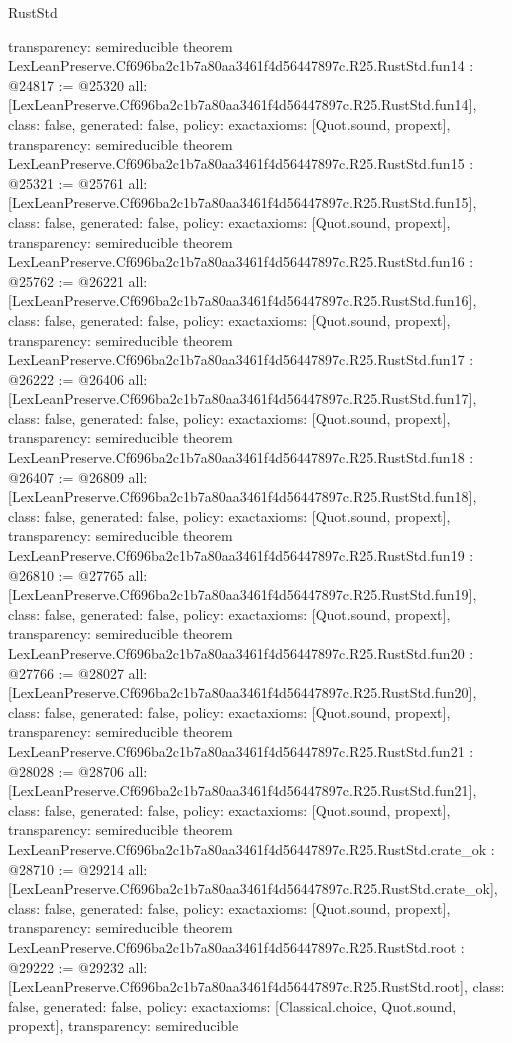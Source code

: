 \begin{lexlean}{RustStd}
\begin{coremodule}
{  transparency: semireducible
}
theorem LexLeanPreserve.Cf696ba2c1b7a80aa3461f4d56447897c.R25.RustStd.fun14 : @24817 := @25320 {
  all: [LexLeanPreserve.Cf696ba2c1b7a80aa3461f4d56447897c.R25.RustStd.fun14],
  class: false,
  generated: false,
  policy: exact{axioms: [Quot.sound, propext]},
  transparency: semireducible
}
theorem LexLeanPreserve.Cf696ba2c1b7a80aa3461f4d56447897c.R25.RustStd.fun15 : @25321 := @25761 {
  all: [LexLeanPreserve.Cf696ba2c1b7a80aa3461f4d56447897c.R25.RustStd.fun15],
  class: false,
  generated: false,
  policy: exact{axioms: [Quot.sound, propext]},
  transparency: semireducible
}
theorem LexLeanPreserve.Cf696ba2c1b7a80aa3461f4d56447897c.R25.RustStd.fun16 : @25762 := @26221 {
  all: [LexLeanPreserve.Cf696ba2c1b7a80aa3461f4d56447897c.R25.RustStd.fun16],
  class: false,
  generated: false,
  policy: exact{axioms: [Quot.sound, propext]},
  transparency: semireducible
}
theorem LexLeanPreserve.Cf696ba2c1b7a80aa3461f4d56447897c.R25.RustStd.fun17 : @26222 := @26406 {
  all: [LexLeanPreserve.Cf696ba2c1b7a80aa3461f4d56447897c.R25.RustStd.fun17],
  class: false,
  generated: false,
  policy: exact{axioms: [Quot.sound, propext]},
  transparency: semireducible
}
theorem LexLeanPreserve.Cf696ba2c1b7a80aa3461f4d56447897c.R25.RustStd.fun18 : @26407 := @26809 {
  all: [LexLeanPreserve.Cf696ba2c1b7a80aa3461f4d56447897c.R25.RustStd.fun18],
  class: false,
  generated: false,
  policy: exact{axioms: [Quot.sound, propext]},
  transparency: semireducible
}
theorem LexLeanPreserve.Cf696ba2c1b7a80aa3461f4d56447897c.R25.RustStd.fun19 : @26810 := @27765 {
  all: [LexLeanPreserve.Cf696ba2c1b7a80aa3461f4d56447897c.R25.RustStd.fun19],
  class: false,
  generated: false,
  policy: exact{axioms: [Quot.sound, propext]},
  transparency: semireducible
}
theorem LexLeanPreserve.Cf696ba2c1b7a80aa3461f4d56447897c.R25.RustStd.fun20 : @27766 := @28027 {
  all: [LexLeanPreserve.Cf696ba2c1b7a80aa3461f4d56447897c.R25.RustStd.fun20],
  class: false,
  generated: false,
  policy: exact{axioms: [Quot.sound, propext]},
  transparency: semireducible
}
theorem LexLeanPreserve.Cf696ba2c1b7a80aa3461f4d56447897c.R25.RustStd.fun21 : @28028 := @28706 {
  all: [LexLeanPreserve.Cf696ba2c1b7a80aa3461f4d56447897c.R25.RustStd.fun21],
  class: false,
  generated: false,
  policy: exact{axioms: [Quot.sound, propext]},
  transparency: semireducible
}
theorem LexLeanPreserve.Cf696ba2c1b7a80aa3461f4d56447897c.R25.RustStd.crate_ok : @28710 := @29214 {
  all: [LexLeanPreserve.Cf696ba2c1b7a80aa3461f4d56447897c.R25.RustStd.crate_ok],
  class: false,
  generated: false,
  policy: exact{axioms: [Quot.sound, propext]},
  transparency: semireducible
}
theorem LexLeanPreserve.Cf696ba2c1b7a80aa3461f4d56447897c.R25.RustStd.root : @29222 := @29232 {
  all: [LexLeanPreserve.Cf696ba2c1b7a80aa3461f4d56447897c.R25.RustStd.root],
  class: false,
  generated: false,
  policy: exact{axioms: [Classical.choice, Quot.sound, propext]},
  transparency: semireducible
}


\end{coremodule}
\end{lexlean}
